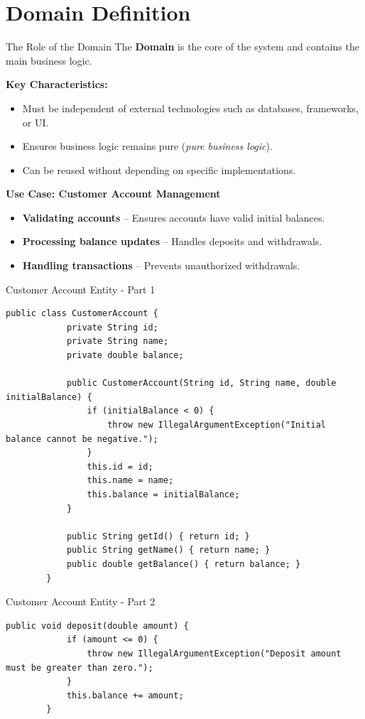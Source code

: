 \documentclass[aspectratio=169, table]{beamer}
\begin{document}
\section{Domain Definition}
\begin{frame}[fragile]{The Role of the Domain}
	\vspace{20pt}
	The \textbf{Domain} is the core of the system and contains the main business logic. 
	
	\textbf{Key Characteristics:}
	\begin{itemize}
		\item Must be independent of external technologies such as databases, frameworks, or UI.
		\item Ensures business logic remains pure (\textit{pure business logic}).
		\item Can be reused without depending on specific implementations.
	\end{itemize}
	
	\textbf{Use Case: Customer Account Management}
	\begin{itemize}
		\item \textbf{Validating accounts} – Ensures accounts have valid initial balances.
		\item \textbf{Processing balance updates} – Handles deposits and withdrawals.
		\item \textbf{Handling transactions} – Prevents unauthorized withdrawals.
	\end{itemize}
\end{frame}


\begin{frame}[fragile]{Customer Account Entity - Part 1}
	\vspace{20pt}
	\begin{lstlisting}[style=JavaStyle]
		public class CustomerAccount {
			private String id;
			private String name;
			private double balance;
			
			public CustomerAccount(String id, String name, double initialBalance) {
				if (initialBalance < 0) {
					throw new IllegalArgumentException("Initial balance cannot be negative.");
				}
				this.id = id;
				this.name = name;
				this.balance = initialBalance;
			}
			
			public String getId() { return id; }
			public String getName() { return name; }
			public double getBalance() { return balance; }
		}
	\end{lstlisting}
\end{frame}

\begin{frame}[fragile]{Customer Account Entity - Part 2}
	\vspace{20pt}
	\begin{lstlisting}[style=JavaStyle]
		public void deposit(double amount) {
			if (amount <= 0) {
				throw new IllegalArgumentException("Deposit amount must be greater than zero.");
			}
			this.balance += amount;
		}
	\end{lstlisting}
\end{frame}
\end{document}
